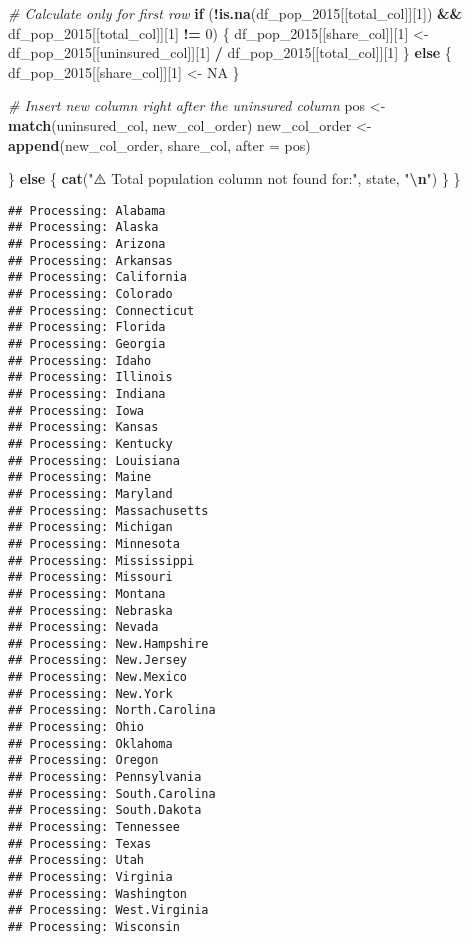 \documentclass[
]{article}
\newenvironment{Shaded}{\begin{snugshade}}{\end{snugshade}}
\newcommand{\AttributeTok}[1]{\textcolor[rgb]{0.13,0.29,0.53}{#1}}
\newcommand{\CommentTok}[1]{\textcolor[rgb]{0.56,0.35,0.01}{\textit{#1}}}
\newcommand{\ConstantTok}[1]{\textcolor[rgb]{0.56,0.35,0.01}{#1}}
\newcommand{\ControlFlowTok}[1]{\textcolor[rgb]{0.13,0.29,0.53}{\textbf{#1}}}
\newcommand{\DecValTok}[1]{\textcolor[rgb]{0.00,0.00,0.81}{#1}}
\newcommand{\FunctionTok}[1]{\textcolor[rgb]{0.13,0.29,0.53}{\textbf{#1}}}
\newcommand{\NormalTok}[1]{#1}
\newcommand{\OtherTok}[1]{\textcolor[rgb]{0.56,0.35,0.01}{#1}}
\newcommand{\SpecialCharTok}[1]{\textcolor[rgb]{0.81,0.36,0.00}{\textbf{#1}}}
\newcommand{\StringTok}[1]{\textcolor[rgb]{0.31,0.60,0.02}{#1}}
\begin{document}
\begin{Shaded}
\begin{Highlighting}[]
    \CommentTok{\# Calculate only for first row}
    \ControlFlowTok{if}\NormalTok{ (}\SpecialCharTok{!}\FunctionTok{is.na}\NormalTok{(df\_pop\_2015[[total\_col]][}\DecValTok{1}\NormalTok{]) }\SpecialCharTok{\&\&}\NormalTok{ df\_pop\_2015[[total\_col]][}\DecValTok{1}\NormalTok{] }\SpecialCharTok{!=} \DecValTok{0}\NormalTok{) \{}
\NormalTok{      df\_pop\_2015[[share\_col]][}\DecValTok{1}\NormalTok{] }\OtherTok{\textless{}{-}}\NormalTok{ df\_pop\_2015[[uninsured\_col]][}\DecValTok{1}\NormalTok{] }\SpecialCharTok{/}\NormalTok{ df\_pop\_2015[[total\_col]][}\DecValTok{1}\NormalTok{]}
\NormalTok{    \} }\ControlFlowTok{else}\NormalTok{ \{}
\NormalTok{      df\_pop\_2015[[share\_col]][}\DecValTok{1}\NormalTok{] }\OtherTok{\textless{}{-}} \ConstantTok{NA}
\NormalTok{    \}}
    
    \CommentTok{\# Insert new column right after the uninsured column}
\NormalTok{    pos }\OtherTok{\textless{}{-}} \FunctionTok{match}\NormalTok{(uninsured\_col, new\_col\_order)}
\NormalTok{    new\_col\_order }\OtherTok{\textless{}{-}} \FunctionTok{append}\NormalTok{(new\_col\_order, share\_col, }\AttributeTok{after =}\NormalTok{ pos)}
    
\NormalTok{  \} }\ControlFlowTok{else}\NormalTok{ \{}
    \FunctionTok{cat}\NormalTok{(}\StringTok{"⚠️ Total population column not found for:"}\NormalTok{, state, }\StringTok{"}\SpecialCharTok{\textbackslash{}n}\StringTok{"}\NormalTok{)}
\NormalTok{  \}}
\NormalTok{\}}
\end{Highlighting}
\end{Shaded}

\begin{verbatim}
## Processing: Alabama 
## Processing: Alaska 
## Processing: Arizona 
## Processing: Arkansas 
## Processing: California 
## Processing: Colorado 
## Processing: Connecticut 
## Processing: Florida 
## Processing: Georgia 
## Processing: Idaho 
## Processing: Illinois 
## Processing: Indiana 
## Processing: Iowa 
## Processing: Kansas 
## Processing: Kentucky 
## Processing: Louisiana 
## Processing: Maine 
## Processing: Maryland 
## Processing: Massachusetts 
## Processing: Michigan 
## Processing: Minnesota 
## Processing: Mississippi 
## Processing: Missouri 
## Processing: Montana 
## Processing: Nebraska 
## Processing: Nevada 
## Processing: New.Hampshire 
## Processing: New.Jersey 
## Processing: New.Mexico 
## Processing: New.York 
## Processing: North.Carolina 
## Processing: Ohio 
## Processing: Oklahoma 
## Processing: Oregon 
## Processing: Pennsylvania 
## Processing: South.Carolina 
## Processing: South.Dakota 
## Processing: Tennessee 
## Processing: Texas 
## Processing: Utah 
## Processing: Virginia 
## Processing: Washington 
## Processing: West.Virginia 
## Processing: Wisconsin
\end{verbatim}
\end{document}
